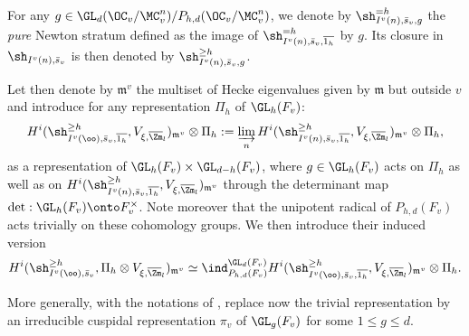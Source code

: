 \begin{nota} \label{nota-strata}
For any $g \in \GL_d(\OC_v/\MC_v^n)/P_{h,d}(\OC_v/\MC_v^n)$, we denote by
$\sh^{=h}_{I^v(n),\bar s_v,g}$ the \emph{pure} Newton stratum defined as the image of
$\sh_{I^v(n),\bar s_v,\overline{1_{h}}}^{=h}$ by $g$.
Its closure in $\sh_{I^v(n),\bar s_v}$ is then denoted by
$\sh^{\geq h}_{I^v(n),\bar s_v,g}$.
\end{nota}

Let then denote by $\mathfrak m^v$ the multiset of
Hecke eigenvalues given by $\mathfrak m$ but outside $v$ and
introduce for any representation $\Pi_h$ of $\GL_h(F_v)$:
\[
H^i(\sh_{I^v(\oo),\bar s_v,\overline{1_{h}}}^{\geq h}, V_{\xi,\overline \Zm_l})_{\mathfrak m^v} \otimes \Pi_h:=
\varinjlim_{{n}} H^i(\sh_{I^v(n),\bar s_v,\overline{1_{h}}}^{\geq h},
V_{\xi,\overline \Zm_l})_{\mathfrak m^v} \otimes \Pi_h,
\]
as a representation of $\GL_h(F_v) \times \GL_{d-h}(F_v)$, where $g \in \GL_h(F_v)$
acts on $\Pi_h$ as well as on $H^i(\sh_{I^v(n),\bar s_v,\overline{1_{h}}}^{\geq h},
V_{\xi,\overline \Zm_l})_{\mathfrak m^v}$ through the determinant map \hbox{$\det: \GL_h(F_v)\onto F_v^\times$}. Note moreover that the unipotent radical of
$P_{h,d}(F_v)$ acts trivially on these cohomology groups.
We then introduce their induced version
\[
H^i(\sh^{\geq h}_{I^v(\oo),\bar s_v},\Pi_h \otimes V_{\xi,\overline \Zm_l})_{\mathfrak m^v}
\simeq \ind_{P_{h,d}(F_v)}^{\GL_d(F_v)} H^i(\sh_{I^v(\oo),\bar s_v,\overline{1_h}}^{\geq h}, V_{\xi,\overline \Zm_l})_{\mathfrak m^v} \otimes \Pi_h.
\]

More generally, with the notations of \cite{boyer-invent2}, replace now the trivial representation by
an irreducible cuspidal representation $\pi_v$ of $\GL_g(F_v)$ for some $1 \leq g \leq d$.

